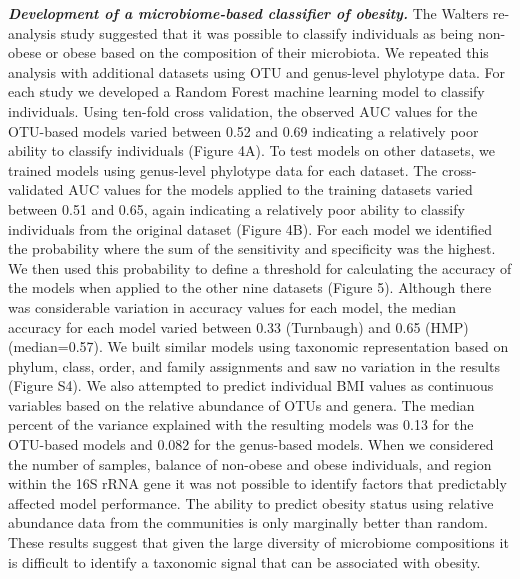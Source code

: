 \documentclass[12pt,]{article}
\begin{document}
\textbf{\emph{Development of a microbiome-based classifier of obesity.}}
The Walters re-analysis study suggested that it was possible to classify
individuals as being non-obese or obese based on the composition of
their microbiota. We repeated this analysis with additional datasets
using OTU and genus-level phylotype data. For each study we developed a
Random Forest machine learning model to classify individuals. Using
ten-fold cross validation, the observed AUC values for the OTU-based
models varied between 0.52 and 0.69 indicating a relatively poor ability
to classify individuals (Figure 4A). To test models on other datasets,
we trained models using genus-level phylotype data for each dataset. The
cross-validated AUC values for the models applied to the training
datasets varied between 0.51 and 0.65, again indicating a relatively
poor ability to classify individuals from the original dataset (Figure
4B). For each model we identified the probability where the sum of the
sensitivity and specificity was the highest. We then used this
probability to define a threshold for calculating the accuracy of the
models when applied to the other nine datasets (Figure 5). Although
there was considerable variation in accuracy values for each model, the
median accuracy for each model varied between 0.33 (Turnbaugh) and 0.65
(HMP) (median=0.57). We built similar models using taxonomic
representation based on phylum, class, order, and family assignments and
saw no variation in the results (Figure S4). We also attempted to
predict individual BMI values as continuous variables based on the
relative abundance of OTUs and genera. The median percent of the
variance explained with the resulting models was 0.13 for the OTU-based
models and 0.082 for the genus-based models. When we considered the
number of samples, balance of non-obese and obese individuals, and
region within the 16S rRNA gene it was not possible to identify factors
that predictably affected model performance. The ability to predict
obesity status using relative abundance data from the communities is
only marginally better than random. These results suggest that given the
large diversity of microbiome compositions it is difficult to identify a
taxonomic signal that can be associated with obesity.
\end{document}
